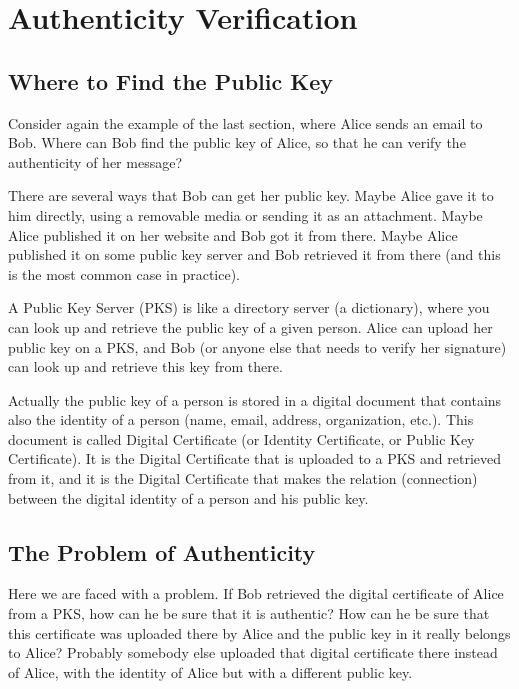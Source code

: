 \documentclass[a4paper]{article}
\begin{document}
\section{Authenticity Verification}

\subsection{Where to Find the Public Key}

Consider again the example of the last section, where Alice sends an
email to Bob. Where can Bob find the public key of Alice, so that he
can verify the authenticity of her message?

There are several ways that Bob can get her public key. Maybe Alice
gave it to him directly, using a removable media or sending it as an
attachment. Maybe Alice published it on her website and Bob got it
from there. Maybe Alice published it on some public key server and Bob
retrieved it from there (and this is the most common case in
practice).

A Public Key Server (PKS) is like a directory server (a dictionary),
where you can look up and retrieve the public key of a given person.
Alice can upload her public key on a PKS, and Bob (or anyone else that
needs to verify her signature) can look up and retrieve this key from
there.

Actually the public key of a person is stored in a digital document
that contains also the identity of a person (name, email, address,
organization, etc.). This document is called Digital Certificate (or
Identity Certificate, or Public Key Certificate). It is the Digital
Certificate that is uploaded to a PKS and retrieved from it, and it is
the Digital Certificate that makes the relation (connection) between
the digital identity of a person and his public key.

\subsection{The Problem of Authenticity}

Here we are faced with a problem. If Bob retrieved the digital
certificate of Alice from a PKS, how can he be sure that it is
authentic? How can he be sure that this certificate was uploaded there
by Alice and the public key in it really belongs to Alice?  Probably
somebody else uploaded that digital certificate there instead of
Alice, with the identity of Alice but with a different public key.
\end{document}
